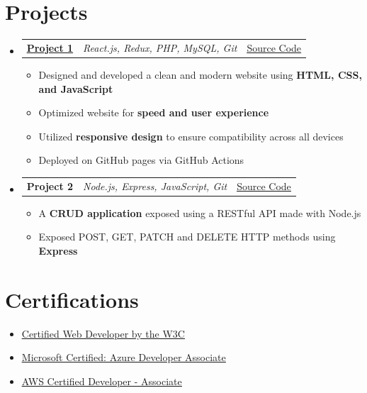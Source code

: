 \documentclass[a4paper,11pt]{article}
\makeatletter
\newcommand{\resumeItem}[1]{
  \item{\small #1\par}
}
\newcommand{\resumeItemListStart}{\begin{itemize}[rightmargin=0.11in, topsep=3pt, parsep=0pt, itemsep=2pt]}
\newcommand{\resumeItemListEnd}{\end{itemize}}
\newcommand{\resumeTrioHeading}[3]{
  \item{\small
    \begin{tabularx}{\linewidth}[t]{
      @{}>{\raggedright\arraybackslash}X@{\hspace{1em}}
      >{\centering\arraybackslash}X@{\hspace{1em}}
      >{\raggedleft\arraybackslash}X@{}
    }
      \textbf{#1} & \textit{#2} & #3
    \end{tabularx}\par
  }
}
\newcommand{\resumeHeadingListStart}{
  \begin{itemize}[leftmargin=0.15in, label={}, topsep=4pt, parsep=0pt, itemsep=3pt]
}
\newcommand{\resumeHeadingListEnd}{\end{itemize}}
\makeatother
\begin{document}
\section{Projects}
  \resumeHeadingListStart{}
    \resumeTrioHeading{\href{https://project1.com}{\uline{Project 1}}}{React.js, Redux, PHP, MySQL, Git}{\href{https://project1.com/source-code/}{\uline{Source Code}}}
      \resumeItemListStart{}
        \resumeItem{Designed and developed a clean and modern website using \textbf{HTML, CSS, and JavaScript}}
        \resumeItem{Optimized website for \textbf{speed and user experience}}
        \resumeItem{Utilized \textbf{responsive design} to ensure compatibility across all devices}
        \resumeItem{Deployed on GitHub pages via GitHub Actions}
      \resumeItemListEnd{}

      \resumeTrioHeading{Project 2}{Node.js, Express, JavaScript, Git}{\href{https://project2.com/source-code/}{\uline{Source Code}}}
      \resumeItemListStart{}
        \resumeItem{A \textbf{CRUD application} exposed using a RESTful API made with Node.js}
        \resumeItem{Exposed POST, GET, PATCH and DELETE HTTP methods using \textbf{Express}}
      \resumeItemListEnd{}
  \resumeHeadingListEnd{}



\section{Certifications}
  \resumeItemListStart{}
    \resumeItem{\href{https://dummy-certification.com}{\uline{Certified Web Developer by the W3C}}}
    \resumeItem{\href{https://dummy-certification.com}{\uline{Microsoft Certified: Azure Developer Associate}}}
    \resumeItem{\href{https://dummy-certification.com}{\uline{AWS Certified Developer - Associate}}}
  \resumeItemListEnd{}
\end{document}
